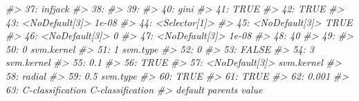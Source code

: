 \documentclass[
  11pt,
  ignorenonframetext,
  dvipsnames,UTF8]{beamer}
\newenvironment{Shaded}{\begin{snugshade}}{\end{snugshade}}
\newcommand{\CommentTok}[1]{\textcolor[rgb]{0.56,0.35,0.01}{\textit{#1}}}
\begin{document}
\begin{frame}[fragile]{}
\begin{Shaded}
\begin{Highlighting}[]
\CommentTok{\#\textgreater{} 37:          infjack                                   }
\CommentTok{\#\textgreater{} 38:                                                    }
\CommentTok{\#\textgreater{} 39:                                                    }
\CommentTok{\#\textgreater{} 40:             gini                                   }
\CommentTok{\#\textgreater{} 41:             TRUE                                   }
\CommentTok{\#\textgreater{} 42:             TRUE                                   }
\CommentTok{\#\textgreater{} 43:   \textless{}NoDefault[3]\textgreater{}                              1e{-}08}
\CommentTok{\#\textgreater{} 44:    \textless{}Selector[1]\textgreater{}                                   }
\CommentTok{\#\textgreater{} 45:   \textless{}NoDefault[3]\textgreater{}                               TRUE}
\CommentTok{\#\textgreater{} 46:   \textless{}NoDefault[3]\textgreater{}                                  0}
\CommentTok{\#\textgreater{} 47:   \textless{}NoDefault[3]\textgreater{}                              1e{-}08}
\CommentTok{\#\textgreater{} 48:               40                                   }
\CommentTok{\#\textgreater{} 49:                                                    }
\CommentTok{\#\textgreater{} 50:                0        svm.kernel                 }
\CommentTok{\#\textgreater{} 51:                1          svm.type                 }
\CommentTok{\#\textgreater{} 52:                0                                   }
\CommentTok{\#\textgreater{} 53:            FALSE                                   }
\CommentTok{\#\textgreater{} 54:                3        svm.kernel                 }
\CommentTok{\#\textgreater{} 55:              0.1                                   }
\CommentTok{\#\textgreater{} 56:             TRUE                                   }
\CommentTok{\#\textgreater{} 57:   \textless{}NoDefault[3]\textgreater{}        svm.kernel                 }
\CommentTok{\#\textgreater{} 58:           radial                                   }
\CommentTok{\#\textgreater{} 59:              0.5          svm.type                 }
\CommentTok{\#\textgreater{} 60:             TRUE                                   }
\CommentTok{\#\textgreater{} 61:             TRUE                                   }
\CommentTok{\#\textgreater{} 62:            0.001                                   }
\CommentTok{\#\textgreater{} 63: C{-}classification                   C{-}classification}
\CommentTok{\#\textgreater{}              default           parents            value}
\end{Highlighting}
\end{Shaded}
\end{frame}
\end{document}
